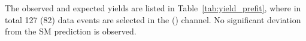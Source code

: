 The observed and expected yields are listed in Table~\ref{tab:yield_prefit},
where in total 127 (82) data events are selected in the \lllljj (\llvvjj) channel.
No significant deviation from the SM prediction is observed.

\begin{table}[!htbp]
\begin{center}




\end{center}
\end{table}
